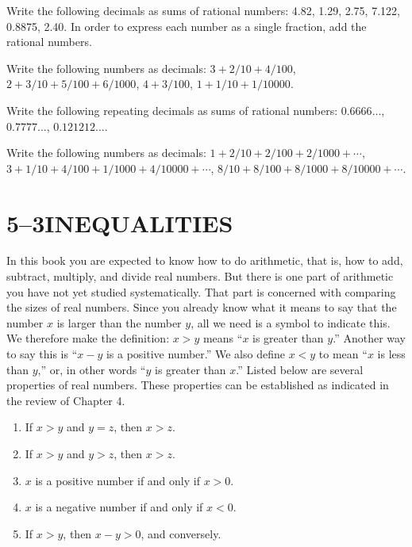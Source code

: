 \documentclass[11pt]{book}
\theoremstyle{bkplain}
\theoremstyle{XIplainnote}
\theoremstyle{bkplain}
\theoremstyle{bkplain}
\begin{document}
\begin{exercisecols}
\begin{exlist}
\item Write the following decimals as sums of rational numbers: 4.82, 1.29,
      2.75, 7.122, 0.8875, 2.40. In order to express each number as a single
      fraction, add the rational numbers.
\item Write the following numbers as decimals: $3 + 2/10 + 4/100$,
      $2 + 3/10 + 5/100 + 6/1000$, $4 + 3/100$, $1 + 1/10 + 1/10000$.
\item Write the following repeating decimals as sums of rational numbers:
      $0.6666\ldots$, $0.7777\ldots$, $0.121212\ldots$.
\item Write the following numbers as decimals:
      $1 + 2/10 + 2/100 + 2/1000 + \cdots$,
      $3 + 1/10 + 4/100 + 1/1000 + 4/10000 + \cdots$,
      $8/10 + 8/100 + 8/1000 + 8/10000 + \cdots$.
\end{exlist}
\end{exercisecols}

\section*{5--3\quad INEQUALITIES}

In this book you are expected to know how to do arithmetic, that is, how to
add, subtract, multiply, and divide real numbers. But there is one part of
arithmetic you have not yet studied systematically. That part is concerned with
comparing the sizes of real numbers. Since you already know what it means to
say that the number $x$ is larger than the number $y$, all we need is a symbol
to indicate this. We therefore make the definition: $x > y$ means ``$x$ is
greater than $y$.'' Another way to say this is ``$x - y$ is a positive
number.'' We also define $x < y$ to mean ``$x$ is less than $y$,'' or, in other
words ``$y$ is greater than $x$.'' Listed below are several properties of real
numbers. These properties can be established as indicated in the review of
Chapter 4.

\begin{enumerate}[label=(\alph*), leftmargin=2.2em, itemsep=1pt, topsep=3pt]
\item If $x > y$ and $y = z$, then $x > z$.
\item If $x > y$ and $y > z$, then $x > z$.
\item $x$ is a positive number if and only if $x > 0$.
\item $x$ is a negative number if and only if $x < 0$.
\item If $x > y$, then $x - y > 0$, and conversely.
\end{enumerate}
\end{document}
